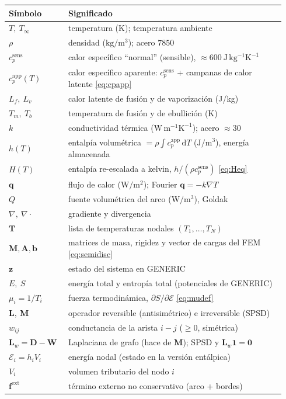 \documentclass[11pt]{article}
\newcommand{\dd}{\mathrm{d}}
\newcommand{\grad}{\nabla}
\newcommand{\Tinf}{T_{\infty}}
\newcommand{\cpapp}{c_p^{\mathrm{app}}}
\newcommand{\cpsens}{c_p^{\mathrm{sens}}}
\newcommand{\Lw}{\bm{L}_{w}}
\theoremstyle{definition}
\theoremstyle{plain}
\begin{document}
\begin{tabular}{@{}p{0.20\linewidth}p{0.74\linewidth}@{}}
\toprule
Símbolo & Significado \\
\midrule
$T,\ \Tinf$        & temperatura (K); temperatura ambiente \\
$\rho$             & densidad ($\mathrm{kg/m^3}$); acero $7850$ \\
$\cpsens$          & calor específico ``normal'' (sensible), $\approx 600\ \mathrm{J\,kg^{-1}K^{-1}}$ \\
$\cpapp(T)$        & calor específico aparente: $\cpsens$ + campanas de calor latente \eqref{eq:cpapp} \\
$L_f,\ L_v$        & calor latente de fusión y de vaporización (J/kg) \\
$T_m,\ T_b$        & temperatura de fusión y de ebullición (K) \\
$k$                & conductividad térmica ($\mathrm{W\,m^{-1}K^{-1}}$); acero $\approx 30$ \\
$h(T)$             & entalpía volumétrica $=\rho\int\cpapp\,\dd T$ ($\mathrm{J/m^3}$), energía almacenada \\
$H(T)$             & entalpía re-escalada a kelvin, $h/(\rho\cpsens)$ \eqref{eq:Heq} \\
$\bm q$            & flujo de calor ($\mathrm{W/m^2}$); Fourier $\bm q=-k\grad T$ \\
$Q$                & fuente volumétrica del arco ($\mathrm{W/m^3}$), Goldak \\
$\grad,\ \grad\!\cdot$ & gradiente y divergencia \\
$\bm T$            & lista de temperaturas nodales $(T_1,\dots,T_N)$ \\
$\bm M,\bm A,\bm b$ & matrices de masa, rigidez y vector de cargas del FEM \eqref{eq:semidisc} \\
$\bm z$            & estado del sistema en GENERIC \\
$E,\ S$            & energía total y entropía total (potenciales de GENERIC) \\
$\mu_i=1/T_i$      & fuerza termodinámica, $\partial S/\partial\mathcal E$ \eqref{eq:mudef} \\
$\bm L,\ \bm M$    & operador reversible (antisimétrico) e irreversible (SPSD) \\
$w_{ij}$           & conductancia de la arista $i\!-\!j$ ($\ge0$, simétrica) \\
$\Lw=\bm D-\bm W$  & Laplaciana de grafo (hace de $\bm M$); SPSD y $\Lw\bm1=\bm0$ \\
$\mathcal E_i=h_iV_i$ & energía nodal (estado en la versión entálpica) \\
$V_i$              & volumen tributario del nodo $i$ \\
$\bm f^{\mathrm{ext}}$ & término externo no conservativo (arco + bordes) \\
\bottomrule
\end{tabular}
\end{document}
